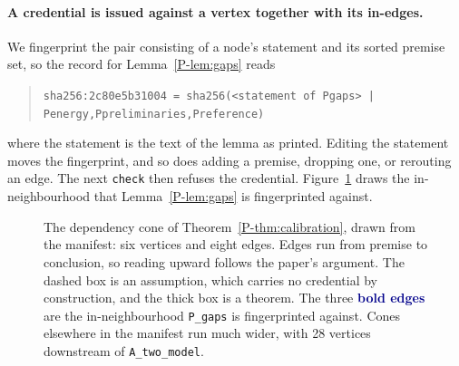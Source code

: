 \documentclass[11pt]{article}
\newcommand{\pref}[1]{\ref*{P-#1}}
\newcommand{\lean}[1]{\begingroup\def\_{\textunderscore\allowbreak}\texttt{\small #1}\endgroup}
\begin{document}
\paragraph{A credential is issued against a vertex together with its in-edges.}
We fingerprint the pair consisting of a node's statement and its sorted
premise set, so the record for Lemma~\pref{lem:gaps} reads

\begin{quote}
\lean{sha256:2c80e5b31004 = sha256(<statement of P\_gaps> |}\\
\lean{P\_energy,P\_preliminaries,P\_reference)}
\end{quote}

where the statement is the text of the lemma as printed. Editing the
statement moves the fingerprint, and so does adding a premise, dropping
one, or rerouting an edge. The next \lean{check} then refuses the
credential. Figure~\ref{fig:cone} draws the in-neighbourhood that
Lemma~\pref{lem:gaps} is fingerprinted against.

\begin{figure}[tb]
\centering
{}
\caption{The dependency cone of Theorem~\pref{thm:calibration}, drawn from
the manifest: six vertices and eight edges. Edges run from premise to
conclusion, so reading upward follows the paper's argument. The dashed box
is an assumption, which carries no credential by construction, and the
thick box is a theorem. The three \textcolor{darkblue}{\textbf{bold edges}}
are the in-neighbourhood \texttt{P\_gaps} is fingerprinted against. Cones
elsewhere in the manifest run much wider, with 28 vertices downstream of
\texttt{A\_two\_model}.}
\label{fig:cone}
\end{figure}
\end{document}
